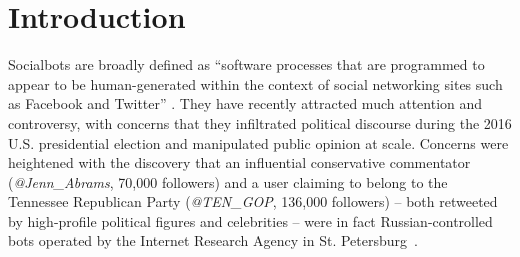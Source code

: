 
\section{Introduction}


Socialbots are broadly defined as ``software processes that are programmed to appear to be human-generated within the context of social networking sites such as Facebook and Twitter'' \cite[p.2]{GehlBakardjieva2016}.
They have recently attracted much attention and controversy, with concerns that they infiltrated political discourse during the 2016 U.S. presidential election and manipulated public opinion at scale. 
Concerns were heightened with the discovery that an influential conservative commentator (\textit{@Jenn\_Abrams}, 70,000 followers) and a user claiming to belong to the Tennessee Republican Party (\textit{@TEN\_GOP}, 136,000 followers) 
-- both retweeted by high-profile political figures and celebrities -- were in fact Russian-controlled bots operated by the Internet Research Agency in St. Petersburg~\cite{abramsDailyBeast,tenGopArticle}.


